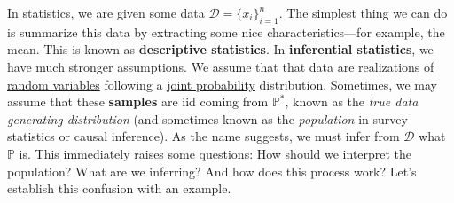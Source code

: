   In statistics, we are given some data $\mathcal{D} = \{x_i\}_{i=1}^n$. The simplest thing we can do is summarize this data by extracting some nice characteristics---for example, the mean. This is known as \textbf{descriptive statistics}. In \textbf{inferential statistics}, we have much stronger assumptions. We assume that that data are realizations of \hyperref[prob-def:random-variable]{random variables} following a \hyperref[prob-def:joint-probability-law]{joint probability} distribution. Sometimes, we may assume that these \textbf{samples} are iid coming from $\mathbb{P}^\ast$, known as the \textit{true data generating distribution} (and sometimes known as the \textit{population} in survey statistics or causal inference). As the name suggests, we must infer from $\mathcal{D}$ what $\mathbb{P}$ is. This immediately raises some questions: How should we interpret the population? What are we inferring? And how does this process work? Let's establish this confusion with an example. 

